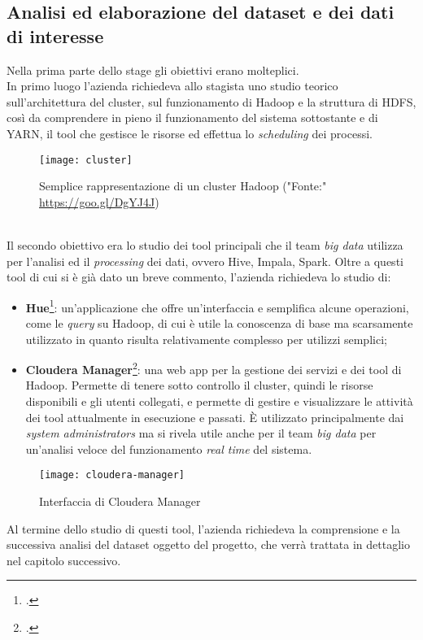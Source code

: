 \subsection{Analisi ed elaborazione del dataset e dei dati di interesse}
Nella prima parte dello stage gli obiettivi erano molteplici. \\
In primo luogo l'azienda richiedeva allo stagista uno studio teorico sull'architettura del \gls{cluster}, sul funzionamento di Hadoop e la struttura di HDFS, così da comprendere in pieno il funzionamento del sistema sottostante e di YARN, il tool che gestisce le risorse ed effettua lo \textit{scheduling} dei processi.
\begin{figure}[!h] 
	\centering 
	\texttt{[image: cluster]}
	\caption{Semplice rappresentazione di un cluster Hadoop ("Fonte:" \href{https://goo.gl/DgYJ4J}{https://goo.gl/DgYJ4J})}
\end{figure}
\\
Il secondo obiettivo era lo studio dei tool principali che il team \textit{big data} utilizza per l'analisi ed il \textit{processing} dei dati, ovvero Hive, Impala, Spark. Oltre a questi tool di cui si è già dato un breve commento, l'azienda richiedeva lo studio di:
\begin{itemize}
	\item \textbf{Hue}\footcite{http://gethue.com/}: un'applicazione che offre un'interfaccia e semplifica alcune operazioni, come le \textit{query} su Hadoop, di cui è utile la conoscenza di base ma scarsamente utilizzato in quanto risulta relativamente complesso per utilizzi semplici;
	\item \textbf{Cloudera Manager}\footcite{https://www.cloudera.com/products/product-components/cloudera-manager.html}: una web app per la gestione dei servizi e dei tool di Hadoop. Permette di tenere sotto controllo il cluster, quindi le risorse disponibili e gli utenti collegati, e permette di gestire e visualizzare le attività dei tool attualmente in esecuzione e passati. È utilizzato principalmente dai \textit{system administrators} ma si rivela utile anche per il team \textit{big data} per un'analisi veloce del funzionamento \textit{real time} del sistema.
\end{itemize} 
\begin{figure}[!h] 
	\centering 
	\texttt{[image: cloudera-manager]}
	\caption{Interfaccia di Cloudera Manager}
\end{figure}
Al termine dello studio di questi tool, l'azienda richiedeva la comprensione e la successiva analisi del dataset oggetto del progetto, che verrà trattata in dettaglio nel capitolo successivo.
